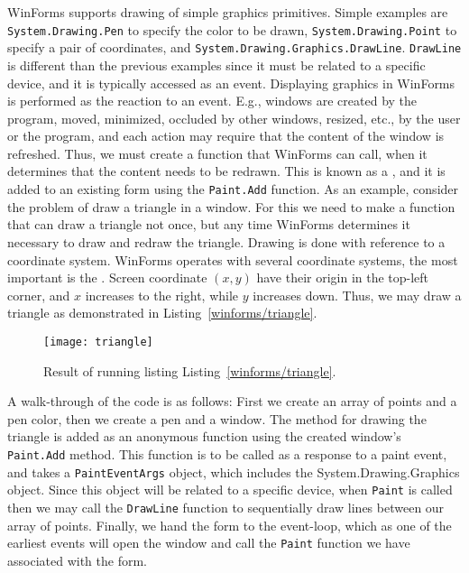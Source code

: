 WinForms supports drawing of simple graphics primitives. Simple examples are \lstinline!System.Drawing.Pen! to specify the color to be drawn, \lstinline!System.Drawing.Point! to specify a pair of coordinates, and \lstinline!System.Drawing.Graphics.DrawLine!. \lstinline!DrawLine! is different than the previous examples since it must be related to a specific device, and it is typically accessed as an event. Displaying graphics in WinForms is performed as the reaction to an event. E.g., windows are created by the program, moved, minimized, occluded by other windows, resized, etc., by the user or the program, and each action may require that the content of the window is refreshed. Thus, we must create a function that WinForms can call, when it determines that the content needs to be redrawn. This is known as a , and it is added to an existing form using the \lstinline!Paint.Add! function. As an example, consider the problem of draw a triangle in a window. For this we need to make a function that can draw a triangle not once, but any time WinForms determines it necessary to draw and redraw the triangle. Drawing is done with reference to a coordinate system. WinForms operates with several coordinate systems, the most important is the . Screen coordinate $(x,y)$ have their origin in the top-left corner, and $x$ increases to the right, while $y$ increases down. Thus, we may draw a triangle as demonstrated in Listing~\ref{winforms/triangle}.
%
%
\begin{figure}
  \centering
  \texttt{[image: triangle]}
  \caption{Result of running listing Listing~\ref{winforms/triangle}.}
  \label{fig:triangle}
\end{figure}
A walk-through of the code is as follows: First we create an array of points and a pen color, then we create a pen and a window. The method for drawing the triangle is added as an anonymous function using the created window's \lstinline!Paint.Add! method. This function is to be called as a response to a paint event, and takes a \lstinline!PaintEventArgs! object, which includes the System.Drawing.Graphics object. Since this object will be related to a specific device, when \lstinline!Paint! is called then we may call the \lstinline!DrawLine! function to sequentially draw lines between our array of points. Finally, we hand the form to the event-loop, which as one of the earliest events will open the window and call the \lstinline!Paint! function we have associated with the form.

